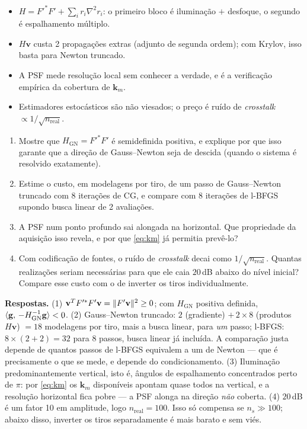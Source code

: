 \documentclass[11pt,a4paper,oneside]{report}
\begin{document}
\begin{resumo}
\begin{itemize}[leftmargin=*, itemsep=1pt]
\item $H = F'^{*}F' + \sum_i r_i\nabla^{2}r_i$: o primeiro bloco \'e
ilumina\c{c}\~ao $+$ desfoque, o segundo \'e espalhamento m\'ultiplo.
\item $H\mathbf{v}$ custa 2 propaga\c{c}\~oes extras (adjunto de segunda
ordem); com Krylov, isso basta para Newton truncado.
\item A PSF mede resolu\c{c}\~ao local sem conhecer a verdade, e \'e a
verifica\c{c}\~ao emp\'irica da cobertura de $\mathbf{k}_m$.
\item Estimadores estoc\'asticos s\~ao n\~ao viesados; o pre\c{c}o \'e
ru\'ido de \emph{crosstalk} $\propto 1/\sqrt{n_{\text{real}}}$.
\end{itemize}
\end{resumo}

\begin{exercicio}[Problemas]
\begin{enumerate}[leftmargin=*, itemsep=2pt]
\item Mostre que $H_{\text{GN}} = F'^{*}F'$ \'e semidefinida positiva, e
explique por que isso garante que a dire\c{c}\~ao de Gauss--Newton seja de
descida (quando o sistema \'e resolvido exatamente).
\item Estime o custo, em modelagens por tiro, de um passo de Gauss--Newton
truncado com 8 itera\c{c}\~oes de CG, e compare com 8 itera\c{c}\~oes de
l-BFGS supondo busca linear de 2 avalia\c{c}\~oes.
\item A PSF num ponto profundo sai alongada na horizontal. Que propriedade da
aquisi\c{c}\~ao isso revela, e por que \eqref{eq:km} j\'a permitia prev\^e-lo?
\item Com codifica\c{c}\~ao de fontes, o ru\'ido de \emph{crosstalk} decai como
$1/\sqrt{n_{\text{real}}}$. Quantas realiza\c{c}\~oes seriam necess\'arias para
que ele caia $20$\,dB abaixo do n\'ivel inicial? Compare esse custo com o de
inverter os tiros individualmente.
\end{enumerate}
\textbf{Respostas.} (1)
$\mathbf{v}^{T}F'^{*}F'\mathbf{v} = \lVert F'\mathbf{v} \rVert^{2}\ge0$; com
$H_{\text{GN}}$ positiva definida,
$\langle \mathbf{g},\,-H_{\text{GN}}^{-1}\mathbf{g}\rangle < 0$. (2) Gauss--Newton
truncado: $2$ (gradiente) $+\,2\times8$ (produtos $H\mathbf{v}$) $= 18$
modelagens por tiro, mais a busca linear, para \emph{um} passo; l-BFGS:
$8\times(2+2) = 32$ para 8 passos, busca linear j\'a inclu\'ida. A
compara\c{c}\~ao justa depende de quantos passos de l-BFGS equivalem a um de
Newton --- que \'e precisamente o que se mede, e depende do condicionamento. (3) Ilumina\c{c}\~ao
predominantemente vertical, isto \'e, \^angulos de espalhamento concentrados
perto de $\pi$: por \eqref{eq:km} os $\mathbf{k}_m$ dispon\'iveis apontam quase
todos na vertical, e a resolu\c{c}\~ao horizontal fica pobre --- a PSF alonga
na dire\c{c}\~ao \emph{n\~ao} coberta. (4) $20$\,dB \'e um fator 10 em
amplitude, logo $n_{\text{real}} = 100$. Isso s\'o compensa se
$n_s \gg 100$; abaixo disso, inverter os tiros separadamente \'e mais barato
e sem vi\'es.
\end{exercicio}
\end{document}
